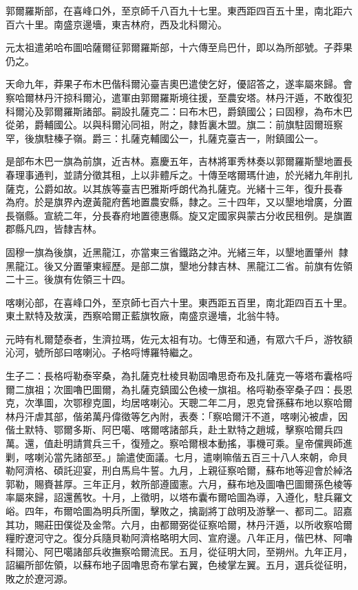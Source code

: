 \begin{pinyinscope}
郭爾羅斯部，在喜峰口外，至京師千八百九十七里。東西距四百五十里，南北距六百六十里。南盛京邊墻，東吉林府，西及北科爾沁。

元太祖遣弟哈布圖哈薩爾征郭爾羅斯部，十六傳至烏巴什，即以為所部號。子莽果仍之。

天命九年，莽果子布木巴偕科爾沁臺吉奧巴遣使乞好，優詔答之，遂率屬來歸。會察哈爾林丹汗掠科爾沁，遣軍由郭爾羅斯境往援，至農安塔。林丹汗遁，不敢復犯科爾沁及郭爾羅斯諸部。嗣設扎薩克二：曰布木巴，爵鎮國公；曰固穆，為布木巴從弟，爵輔國公。以與科爾沁同祖，附之，隸哲裏木盟。旗二：前旗駐固爾班察罕，後旗駐榛子嶺。爵三：扎薩克輔國公一，扎薩克臺吉一，附鎮國公一。

是部布木巴一旗為前旗，近吉林。嘉慶五年，吉林將軍秀林奏以郭爾羅斯墾地置長春理事通判，並請分徵其租，上以非體斥之。十傳至喀爾瑪什迪，於光緒九年削扎薩克，公爵如故。以其族等臺吉巴雅斯呼朗代為扎薩克。光緒十三年，復升長春為府。於是旗界內遼黃龍府舊地置農安縣，隸之。三十四年，又以墾地增廣，分置長嶺縣。宣統二年，分長春府地置德惠縣。旋又定國家與蒙古分收民租例。是旗置郡縣凡四，皆隸吉林。

固穆一旗為後旗，近黑龍江，亦當東三省鐵路之沖。光緒三年，以墾地置肇州，隸黑龍江。後又分置肇東經歷。是部二旗，墾地分隸吉林、黑龍江二省。前旗有佐領二十三。後旗有佐領三十四。

喀喇沁部，在喜峰口外，至京師七百六十里。東西距五百里，南北距四百五十里。東土默特及敖漢，西察哈爾正藍旗牧廠，南盛京邊墻，北翁牛特。

元時有札爾楚泰者，生濟拉瑪，佐元太祖有功。七傳至和通，有眾六千戶，游牧額沁河，號所部曰喀喇沁。子格哷博羅特繼之。

生子二：長格哷勒泰宰桑，為扎薩克杜棱貝勒固嚕思奇布及扎薩克一等塔布囊格哷爾二旗祖；次圖嚕巴圖爾，為扎薩克鎮國公色棱一旗祖。格哷勒泰宰桑子四：長恩克，次準圖，次鄂穆克圖，均居喀喇沁。天聰二年二月，恩克曾孫蘇布地以察哈爾林丹汗虐其部，偕弟萬丹偉徵等乞內附，表奏：「察哈爾汗不道，喀喇沁被虐，因偕土默特、鄂爾多斯、阿巴噶、喀爾喀諸部兵，赴土默特之趙城，擊察哈爾兵四萬。還，值赴明請賞兵三千，復殪之。察哈爾根本動搖，事機可乘。皇帝儻興師進剿，喀喇沁當先諸部至。」諭遣使面議。七月，遣喇嘛偕五百三十八人來朝，命貝勒阿濟格、碩託迎宴，刑白馬烏牛誓。九月，上親征察哈爾，蘇布地等迎會於綽洛郭勒，賜賚甚厚。三年正月，敕所部遵國憲。六月，蘇布地及圖嚕巴圖爾孫色棱等率屬來歸，詔還舊牧。十月，上徵明，以塔布囊布爾哈圖為導，入遵化，駐兵羅文峪。四年，布爾哈圖為明兵所圍，擊敗之，擒副將丁啟明及游擊一、都司二。詔嘉其功，賜莊田僕從及金幣。六月，由都爾弼從征察哈爾，林丹汗遁，以所收察哈爾糧貯遼河守之。復分兵隨貝勒阿濟格略明大同、宣府邊。八年正月，偕巴林、阿嚕科爾沁、阿巴噶諸部兵收撫察哈爾流民。五月，從征明大同，至朔州。九年正月，詔編所部佐領，以蘇布地子固嚕思奇布掌右翼，色棱掌左翼。五月，選兵從征明，敗之於遼河源。


\end{pinyinscope}
